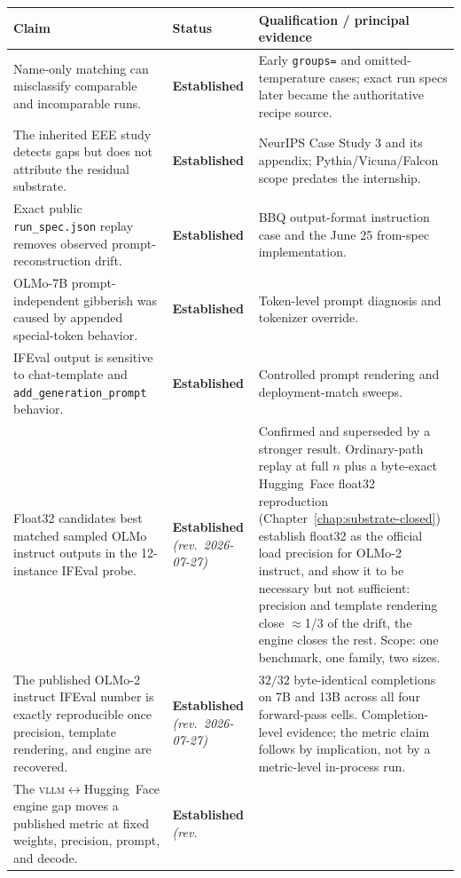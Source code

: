 \documentclass[11pt]{report}
\newcommand{\code}[1]{\texttt{#1}}
\newcommand{\file}[1]{\texttt{#1}}
\newcommand{\statusEstablished}{\textbf{Established}}
\begin{document}
\begin{longtable}{@{}p{}p{}p{}@{}}
\toprule
\textbf{Claim} & \textbf{Status} & \textbf{Qualification / principal evidence} \\
\midrule
\endhead
Name-only matching can misclassify comparable and incomparable runs. &
\statusEstablished & Early \code{groups=} and omitted-temperature cases; exact run
specs later became the authoritative recipe source. \\
The inherited EEE study detects gaps but does not attribute the residual substrate. &
\statusEstablished & NeurIPS Case Study 3 and its appendix; Pythia/Vicuna/Falcon
scope predates the internship. \\
Exact public \file{run\_spec.json} replay removes observed prompt-reconstruction
drift. & \statusEstablished & BBQ output-format instruction case and the June 25
from-spec implementation. \\
OLMo-7B prompt-independent gibberish was caused by appended special-token behavior. &
\statusEstablished & Token-level prompt diagnosis and tokenizer override. \\
IFEval output is sensitive to chat-template and
\code{add\_generation\_prompt} behavior. & \statusEstablished & Controlled prompt
rendering and deployment-match sweeps. \\
Float32 candidates best matched sampled OLMo instruct outputs in the 12-instance
IFEval probe. & \statusEstablished{} \emph{(rev.\ 2026-07-27)} & Confirmed and
superseded by a stronger result. Ordinary-path replay at full $n$ plus a byte-exact
Hugging~Face float32 reproduction (Chapter~\ref{chap:substrate-closed}) establish
float32 as the official load precision for OLMo-2 instruct, and show it to be
necessary but not sufficient: precision and template rendering close
$\approx$1/3 of the drift, the engine closes the rest. Scope: one benchmark, one
family, two sizes. \\
The published OLMo-2 instruct IFEval number is exactly reproducible once precision,
template rendering, and engine are recovered. & \statusEstablished{} \emph{(rev.\
2026-07-27)} & $32/32$ byte-identical completions on 7B and 13B across all four
forward-pass cells. Completion-level evidence; the metric claim follows by
implication, not by a metric-level in-process run. \\
The \textsc{vllm}$\leftrightarrow$Hugging~Face engine gap moves a published metric at
fixed weights, precision, prompt, and decode. & \statusEstablished{} \emph{(rev.\
}
\end{longtable}
\end{document}
